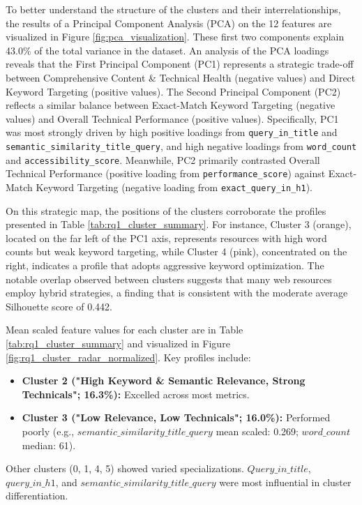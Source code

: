 \documentclass[a4paper,fleqn]{cas-sc}
\begin{document}
To better understand the structure of the clusters and their interrelationships, the results of a Principal Component Analysis (PCA) on the 12 features are visualized in Figure \ref{fig:pca_visualization}. These first two components explain 43.0\% of the total variance in the dataset. An analysis of the PCA loadings reveals that the First Principal Component (PC1) represents a strategic trade-off between Comprehensive Content \& Technical Health (negative values) and Direct Keyword Targeting (positive values). The Second Principal Component (PC2) reflects a similar balance between Exact-Match Keyword Targeting (negative values) and Overall Technical Performance (positive values). Specifically, PC1 was most strongly driven by high positive loadings from \texttt{query\_in\_title} and \texttt{semantic\_similarity\_title\_query}, and high negative loadings from \texttt{word\_count} and \texttt{accessibility\_score}. Meanwhile, PC2 primarily contrasted Overall Technical Performance (positive loading from \texttt{performance\_score}) against Exact-Match Keyword Targeting (negative loading from \texttt{exact\_query\_in\_h1}).

On this strategic map, the positions of the clusters corroborate the profiles presented in Table \ref{tab:rq1_cluster_summary}. For instance, Cluster 3 (orange), located on the far left of the PC1 axis, represents resources with high word counts but weak keyword targeting, while Cluster 4 (pink), concentrated on the right, indicates a profile that adopts aggressive keyword optimization. The notable overlap observed between clusters suggests that many web resources employ hybrid strategies, a finding that is consistent with the moderate average Silhouette score of 0.442.


Mean scaled feature values for each cluster are in Table \ref{tab:rq1_cluster_summary} and visualized in Figure \ref{fig:rq1_cluster_radar_normalized}.
Key profiles include:
\begin{itemize}
\item \textbf{Cluster 2 ("High Keyword \& Semantic Relevance, Strong Technicals"; 16.3\%):} Excelled across most metrics.
\item \textbf{Cluster 3 ("Low Relevance, Low Technicals"; 16.0\%):} Performed poorly (e.g., $semantic\_similarity\_title\_query$ mean scaled: \num{0.269}; $word\_count$ median: \num{61}).
\end{itemize}
Other clusters (0, 1, 4, 5) showed varied specializations. $Query\_in\_title$, $query\_in\_h1$, and $semantic\_similarity\_title\_query$ were most influential in cluster differentiation.
\end{document}
